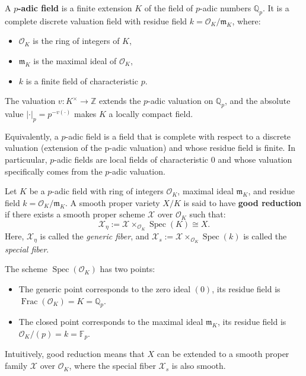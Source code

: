 \documentclass[12pt]{article}
\begin{document}
\begin{definition}
    A \textbf{\(p\)-adic field} is a finite extension \(K\) of the field of \(p\)-adic numbers \(\mathbb{Q}_p\). It is a complete discrete valuation field with residue field \(k = \mathcal{O}_K / \mathfrak{m}_K\), where:
    \begin{itemize}
        \item \(\mathcal{O}_K\) is the ring of integers of \(K\),
        \item \(\mathfrak{m}_K\) is the maximal ideal of \(\mathcal{O}_K\),
        \item \(k\) is a finite field of characteristic \(p\).
    \end{itemize}
    The valuation \(v: K^\times \to \mathbb{Z}\) extends the \(p\)-adic valuation on \(\mathbb{Q}_p\), and the absolute value \(|\cdot|_p = p^{-v(\cdot)}\) makes \(K\) a locally compact field.
\end{definition}

\begin{remark}
    Equivalently, a \(p\)-adic field is a field that is complete with respect to a discrete valuation (extension of the p-adic valuation) and whose residue field is finite. In particuular, $p$-adic fields are local fields of characteristic $0$ and whose valuation specifically comes from the $p$-adic valuation.
\end{remark}


\begin{definition}
    Let \( K \) be a \( p \)-adic field with ring of integers \( \mathcal{O}_K \), maximal ideal \( \mathfrak{m}_K \), and residue field \( k = \mathcal{O}_K / \mathfrak{m}_K \). A smooth proper variety \( X/K \) is said to have \textbf{good reduction} if there exists a smooth proper scheme \( \mathcal{X} \) over \( \mathcal{O}_K \) such that:
    \[
    \mathcal{X}_\eta := \mathcal{X} \times_{\mathcal{O}_K} \operatorname{Spec}(K) \cong X.
    \]
    Here, \( \mathcal{X}_\eta \) is called the \emph{generic fiber}, and \( \mathcal{X}_s := \mathcal{X} \times_{\mathcal{O}_K} \operatorname{Spec}(k) \) is called the \emph{special fiber}.
\end{definition}

\begin{remark}
    The scheme \(\operatorname{Spec}(\mathcal{O}_K)\) has two points:
\begin{itemize}
    \item The generic point corresponds to the zero ideal \((0)\), its residue field is \(\operatorname{Frac}(\mathcal{O}_K) = K = \mathbb{Q}_p\).
    \item The closed point corresponds to the maximal ideal $\mathfrak{m}_K$, its residue field is \(\mathcal{O}_K / (p) = k = \mathbb{F}_p\).
\end{itemize}
    Intuitively, good reduction means that \( X \) can be extended to a smooth proper family \( \mathcal{X} \) over \( \mathcal{O}_K \), where the special fiber \( \mathcal{X}_s \) is also smooth.
\end{remark}
\end{document}
